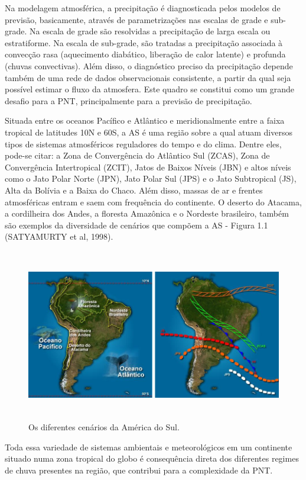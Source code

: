 Na modelagem atmosférica, a precipitação é diagnosticada pelos modelos de previsão, basicamente, através de parametrizações nas escalas de grade e sub-grade. Na escala de grade são resolvidas a precipitação de larga escala ou estratiforme. Na escala de sub-grade, são tratadas a precipitação associada à convecção rasa (aquecimento diabático, liberação de calor latente) e profunda (chuvas convectivas).  Além disso, o diagnóstico preciso da precipitação depende também de uma rede de dados observacionais consistente, a partir da qual seja possível estimar o fluxo da atmosfera. Este quadro se constitui como um grande desafio para a PNT, principalmente para a previsão de precipitação.

Situada entre os oceanos Pacífico e Atlântico e meridionalmente entre a faixa tropical de latitudes 10N e 60S, a AS é uma região sobre a qual atuam diversos tipos de sistemas atmosféricos reguladores do tempo e do clima. Dentre eles, pode-se citar: a Zona de Convergência do Atlântico Sul (ZCAS), Zona de Convergência Intertropical (ZCIT), Jatos de Baixos Níveis (JBN) e altos níveis como o Jato Polar Norte (JPN), Jato Polar Sul (JPS) e o Jato Subtropical (JS), Alta da Bolívia e a Baixa do Chaco. Além disso, massas de ar e frentes atmosféricas entram e saem com frequência do continente. O deserto do Atacama, a cordilheira dos Andes, a floresta Amazônica e o Nordeste brasileiro, também são exemplos da diversidade de cenários que compõem a AS - Figura 1.1 (SATYAMURTY et al, 1998).

\begin{figure}
\centering
\includegraphics[height=7.5cm]{./figs/fig02.png}
\caption{Os diferentes cenários da América do Sul.}
\label{fig02}
\end{figure}

Toda essa variedade de sistemas ambientais e meteorológicos em um continente situado numa zona tropical do globo é consequência direta dos diferentes regimes de chuva presentes na região, que contribui para a complexidade da PNT.

